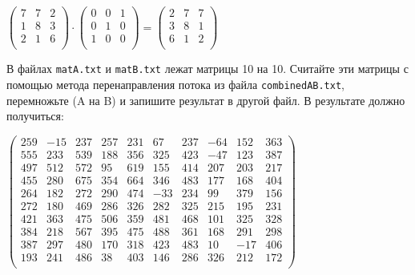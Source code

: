 \documentclass{article}
\begin{document}
\begin{center}

$
\begin{pmatrix}
7 & 7 & 2 \\
1 & 8 & 3 \\
2 & 1 & 6 \\
\end{pmatrix}  \cdot 
\begin{pmatrix}
0 & 0 & 1 \\
0 & 1 & 0 \\
1 & 0 & 0 \\
\end{pmatrix}
=
\begin{pmatrix}
2 & 7 & 7 \\
3 & 8 & 1 \\
6 & 1 & 2 \\
\end{pmatrix}
$
\end{center}
В файлах \texttt{matA.txt} и \texttt{matB.txt} лежат матрицы 10 на 10. Считайте эти матрицы с помощью метода перенаправления потока из файла \texttt{combinedAB.txt}, перемножьте (A на B) и запишите результат в другой файл. В результате должно получиться:
\begin{center}
$
\begin{pmatrix}
259 & -15 & 237 & 257 &  231 &  67  & 237  & -64  & 152  & 363 \\
555 & 233 & 539 & 188 &  356 &  325 &  423 &  -47 &  123 &  387 \\
497 & 512 & 572 & 95  & 619  & 155  & 414  & 207  & 203  & 217 \\
455 & 280 & 675 & 354 &  664 &  346 &  483 &  177 &  168 &  404 \\
264 & 182 & 272 & 290 &  474 &  -33 &  234 &  99  & 379  & 156 \\
272 & 180 & 469 & 286 &  326 &  282 &  325 &  215 &  195 &  231 \\
421 & 363 & 475 & 506 &  359 &  481 &  468 &  101 &  325 &  328 \\
384 & 218 & 567 & 395 &  475 &  488 &  361 &  168 &  291 &  298 \\
387 & 297 & 480 & 170 &  318 &  423 &  483 &  10  & -17  & 406 \\
193 & 241 & 486 & 38  & 403  & 146  & 286  & 326  & 212  & 172 \\
\end{pmatrix}
$
\end{center}
\end{document}

